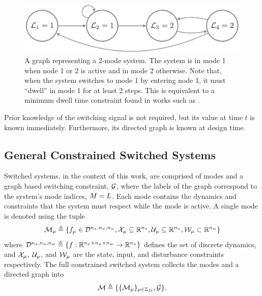 \begin{figure}[t]
\centering
\includegraphics[scale=0.15]{./figures/graph_remark}
\caption{A graph representing a 2-mode system. The system is in mode 1 when node 1 or 2 is active and in mode 2 otherwise. Note that, when the system switches to mode 1 by entering node 1, it must ``dwell'' in mode 1 for at least 2 steps. This is equivalent to a minimum dwell time constraint found in works such as \cite{Danielson2019}.}
\label{fig:graph_ex}
\end{figure}

Prior knowledge of the switching signal is not required, but its value at time $t$ is known immediately. Furthermore, its directed graph is known at design time. 
\subsection{General Constrained Switched Systems}
Switched systems, in the context of this work, are comprised of \nummodes modes and a graph based switching constraint, $\mathcal{G}$, where the labels of the graph correspond to the system's mode indices, $\nummodes=\gnumlabels$. Each mode contains the dynamics and constraints that the system must respect while the mode is active. A single mode is denoted using the tuple
\begin{equation}
\mode{\modeidx}\triangleq\{f_\modeidx\in \mathcal{D}^{\nx,\nu,\nw}, \xcon[\modeidx]\subseteq\real^\nx, \ucon[\modeidx]\subseteq\real^\nu, \wcon[\modeidx]\subset\real^\nw\}\nonumber
\end{equation}
where $\mathcal{D}^{{n_x},{n_u},{n_w}}\triangleq\{f:\mathbb{R}^{{n_x}\times{n_u}\times{n_w}}\rightarrow\mathbb{R}^{{n_x}}\}$ defines the set of discrete dynamics,  and $\xcon[\modeidx]$, $\ucon[\modeidx]$, and  $\wcon[\modeidx]$ are the state, input, and disturbance constraints respectively. The full constrained switched system collects the modes and a directed graph into
\begin{equation}\label{eq:basic_switched_sys}
\modes\triangleq\{\{\mode{\modeidx}\}_{\modeidx\in\idxset{\nummodes}}, \graph\}.
\end{equation}

